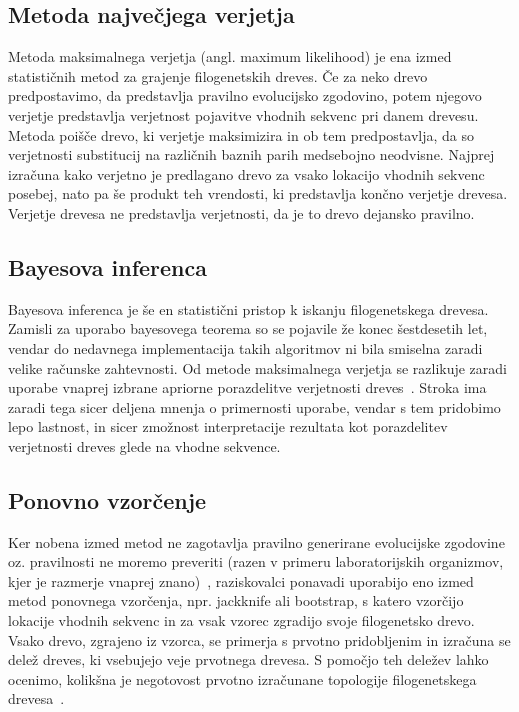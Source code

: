 \documentclass[a4paper, 12pt]{book}
\begin{document}
\subsection{Metoda največjega verjetja}
Metoda maksimalnega verjetja (angl. maximum likelihood) je ena izmed statističnih metod za grajenje filogenetskih dreves. Če za neko drevo predpostavimo, da predstavlja pravilno evolucijsko zgodovino, potem njegovo verjetje predstavlja verjetnost pojavitve vhodnih sekvenc pri danem drevesu. Metoda poišče drevo, ki verjetje maksimizira in ob tem predpostavlja, da so verjetnosti substitucij na različnih baznih parih medsebojno neodvisne. Najprej izračuna kako verjetno je predlagano drevo za vsako lokacijo vhodnih sekvenc posebej, nato pa še produkt teh vrendosti, ki predstavlja končno verjetje drevesa. Verjetje drevesa ne predstavlja verjetnosti, da je to drevo dejansko pravilno. 

\subsection{Bayesova inferenca}
Bayesova inferenca je še en statistični pristop k iskanju filogenetskega drevesa. Zamisli za uporabo bayesovega teorema so se pojavile že konec šestdesetih let, vendar do nedavnega implementacija takih algoritmov ni bila smiselna zaradi velike računske zahtevnosti. Od metode maksimalnega verjetja se razlikuje zaradi uporabe vnaprej izbrane apriorne porazdelitve verjetnosti dreves~\cite{fel}. Stroka ima zaradi tega sicer deljena mnenja o primernosti uporabe, vendar s tem pridobimo lepo lastnost, in sicer zmožnost interpretacije rezultata kot porazdelitev verjetnosti dreves glede na vhodne sekvence.

\subsection{Ponovno vzorčenje}

Ker nobena izmed metod ne zagotavlja pravilno generirane evolucijske zgodovine oz. pravilnosti ne moremo preveriti (razen v primeru laboratorijskih organizmov, kjer je razmerje vnaprej znano)~\cite{phy}, raziskovalci ponavadi uporabijo eno izmed metod ponovnega vzorčenja, npr. jackknife ali bootstrap, s katero vzorčijo lokacije vhodnih sekvenc in za vsak vzorec zgradijo svoje filogenetsko drevo. Vsako drevo, zgrajeno iz vzorca, se primerja s prvotno pridobljenim in izračuna se delež dreves, ki vsebujejo veje prvotnega drevesa. S pomočjo teh deležev lahko ocenimo, kolikšna je negotovost prvotno izračunane topologije filogenetskega drevesa~\cite{fel}.   
\end{document}
